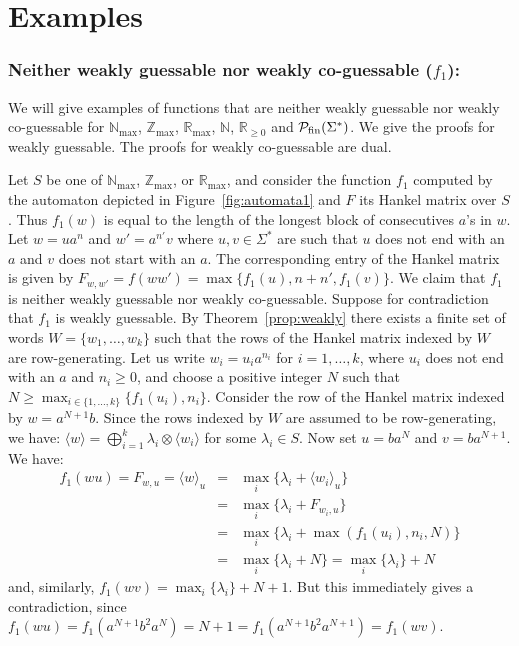 \documentclass{lmcs}
\numberwithin{theorem}{section}
\begin{document}
\section{Examples}
\label{appendix:examples}

	\subsubsection*{\textbf{Neither weakly guessable nor weakly co-guessable ($f_1$):}}
	We will give examples of functions that are neither weakly guessable nor weakly co-guessable for $\mathbb{N}_{\max}$, $\mathbb{Z}_{\max}$, $\mathbb{R}_{\max}$, $\mathbb{N}$, $\mathbb{R}_{\geq 0}$ and $\mathcal{P}_{\rm fin}(\Sigma^*)$. We give the proofs for weakly guessable. The proofs for weakly co-guessable are dual.
	
	Let $S$ be one of $\mathbb{N}_{\max}$, $\mathbb{Z}_{\max}$, or $\mathbb{R}_{\max}$, and consider the function $f_1$ computed by the automaton depicted in Figure~\ref{fig:automata1} and $F$ its Hankel matrix over $S$. Thus $f_1(w)$ is equal to the length of the longest block of consecutives $a$'s in $w$. Let $w = ua^n$ and $w'=a^{n'}v$ where $u, v \in\Sigma^*$ are such that $u$ does not end with an $a$ and $v$ does not start with an $a$. The corresponding entry of the Hankel matrix is given by $F_{w,w'} =f(ww') = {\max}\{f_1(u), n+n', f_1(v)\}$. We claim that $f_1$ is neither weakly guessable nor weakly co-guessable. Suppose for contradiction that $f_1$ is weakly guessable. By Theorem~\ref{prop:weakly} there exists a finite set of words $W=\{w_1, \ldots ,w_k\}$ such that the rows of the Hankel matrix indexed by $W$ are row-generating. Let us write $w_i = u_ia^{n_i}$ for $i=1, \ldots ,k$, where $u_i$ does not end with an $a$ and $n_i \geq 0$, and choose a positive integer $N$ such that $N\geq {\max}_{i \in \{1,\ldots,k\}}\{f_1(u_i), n_i\}$. Consider the row of the Hankel matrix indexed by $w=a^{N+1}b$. Since the rows indexed by $W$ are assumed to be row-generating, we have:
	$\langle w \rangle = \bigoplus_{i=1}^k \lambda_i \otimes \langle w_i \rangle$ for some $\lambda_i \in S$. Now set $u = ba^{N}$ and $v=ba^{N+1}$. We have:
	\begin{eqnarray*}
		f_1(wu) = F_{w,u} = \langle w \rangle_u &=& {\max}_{i}\{\lambda_i + \langle w_i \rangle_ u\}\\
		&=& {\max}_{i}\{\lambda_i + F_{w_i, u}\}\\
		&=& {\max}_{i}\{\lambda_i + \max(f_1(u_i), n_i, N)\}\\
		&=& {\max}_{i}\{\lambda_i + N\} = {\max}_{i}\{\lambda_i\} + N  
	\end{eqnarray*} 
	and, similarly, $f_1(wv) = {\max}_{i}\{\lambda_i\} + N +1$.  But this immediately gives a contradiction, since $f_1(wu) = f_1(a^{N+1}b^2a^N) = N+1 = f_1(a^{N+1}b^2a^{N+1}) = f_1(wv)$.
	
\end{document}
